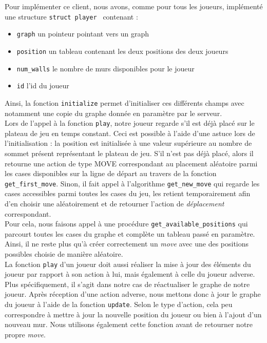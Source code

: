\documentclass[11pt]{article}
\begin{document}
Pour implémenter ce client, nous avons, comme pour tous les joueurs, implémenté une structure \texttt{struct player } contenant :
\begin{itemize}
    \item \texttt{graph} un pointeur pointant vers un graph
    \item \texttt{position} un tableau contenant les deux positions des deux joueurs
    \item \texttt{num\_walls} le nombre de murs disponibles pour le joueur
    \item \texttt{id} l'id du joueur \\
\end{itemize}

Ainsi, la fonction \texttt{initialize} permet d'initialiser ces différents champs avec notamment une copie du graphe donnée en paramètre par le serveur. \\

Lors de l'appel à la fonction \texttt{play}, notre joueur regarde s'il est déjà placé sur le plateau de jeu en temps constant. Ceci est possible à l'aide d'une astuce lors de l'initialisation : la position est initialisée à une valeur supérieure au nombre de sommet présent représentant le plateau de jeu. S'il n'est pas déjà placé, alors il retourne une action de type MOVE correspondant au placement aléatoire parmi les cases disponibles sur la ligne de départ au travers de la fonction \texttt{get\_first\_move}. Sinon, il fait appel à l'algorithme \texttt{get\_new\_move} qui regarde les cases accessibles parmi toutes les cases du jeu, les retient temporairement afin d'en choisir une aléatoirement et de retourner l'action de \textit{déplacement} correspondant. \\

\noindent Pour cela, nous faisons appel à une procédure \texttt{get\_available\_positions} qui parcourt toutes les cases du graphe et complète un tableau passé en paramètre. Ainsi, il ne reste plus qu'à créer correctement un \textit{move} avec une des positions possibles choisie de manière aléatoire. \\

\noindent La fonction \texttt{play} d'un joueur doit aussi réaliser la mise à jour des éléments du joueur par rapport à son action à lui, mais également à celle du joueur adverse. Plus spécifiquement, il s'agit dans notre cas de réactualiser le graphe de notre joueur. Après réception d'une action adverse, nous mettons donc à jour le graphe du joueur à l'aide de la fonction \texttt{update}. Selon le type d'action, cela peu correspondre à mettre à jour la nouvelle position du joueur ou bien à l'ajout d'un nouveau mur. Nous utilisons également cette fonction avant de retourner notre propre \textit{move}.
\end{document}

